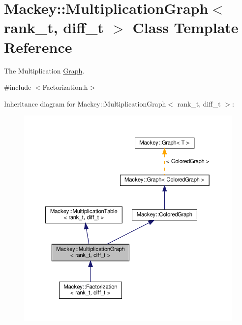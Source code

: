 \hypertarget{classMackey_1_1MultiplicationGraph}{}\section{Mackey\+:\+:Multiplication\+Graph$<$ rank\+\_\+t, diff\+\_\+t $>$ Class Template Reference}
\label{classMackey_1_1MultiplicationGraph}


The Multiplication \hyperlink{classMackey_1_1Graph}{Graph}.  




{\ttfamily \#include $<$Factorization.\+h$>$}



Inheritance diagram for Mackey\+:\+:Multiplication\+Graph$<$ rank\+\_\+t, diff\+\_\+t $>$\+:\nopagebreak
\begin{figure}[H]
\begin{center}
\leavevmode
\includegraphics[width=350pt]{classMackey_1_1MultiplicationGraph__inherit__graph}
\end{center}
\end{figure}


